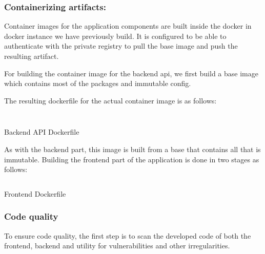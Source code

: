 \subsubsection{Containerizing artifacts:}

Container images for the application components are built inside the docker in docker instance we have previously build. It is configured to be able to authenticate with the private registry to pull the base image and push the resulting artifact. 


For building the container image for the backend api, we first build a base image which contains most of the packages and immutable config. 

The resulting dockerfile for the actual container image is as follows: 

\begin{listing}[H]
    \inputminted[firstline=1,lastline=30]{Dockerfile}{codeListing/syst_backend_Dockerfile}
\end{listing}
\begin{listing}[H]
     \inputminted[firstline=31]{Dockerfile}{codeListing/syst_backend_Dockerfile}
    \caption{Backend API Dockerfile}
    \label{lst:API Dockerfile}
\end{listing}
 


As with the backend part, this image is built from a base that contains all that is immutable. Building the frontend part of the application is done in two stages as follows: 

 \begin{listing}[H]
    \inputminted{Dockerfile}{codeListing/syst_frontend_Dockerfile}
    \caption{Frontend Dockerfile}
    \label{lst:Dind Dockerfile}
\end{listing}


 
\subsubsection{Code quality }


To ensure code quality, the first step is to scan the developed code of both the frontend, backend and utility for vulnerabilities and other irregularities.  

